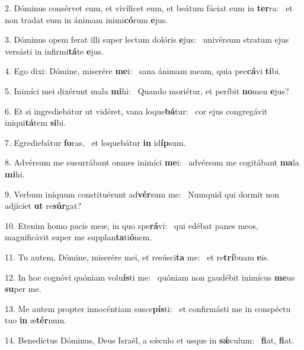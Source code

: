 2. Dóminus consérvet eum, et vivíficet eum, et beátum fáciat eum in \textbf{ter}ra: \ast\  et non tradat eum in ánimam inimi\textbf{có}rum \textbf{e}jus.\

3. Dóminus opem ferat illi super lectum dolóris \textbf{e}jus: \ast\  univérsum stratum ejus versásti in infirmi\textbf{tá}te \textbf{e}jus.\

4. Ego dixi: Dómine, miserére \textbf{me}i: \ast\  sana ánimam meam, quia pec\textbf{cá}vi \textbf{ti}bi.\

5. Inimíci mei dixérunt mala \textbf{mi}hi: \ast\  Quando moriétur, et períbit \textbf{no}men \textbf{e}jus?\

6. Et si ingrediebátur ut vidéret, vana loque\textbf{bá}tur: \ast\  cor ejus congregávit iniqui\textbf{tá}tem \textbf{si}bi.\

7. Egrediebátur \textbf{fo}ras, \ast\  et loquebátur \textbf{in} id\textbf{íp}sum.\

8. Advérsum me susurrábant omnes inimíci \textbf{me}i: \ast\  advérsum me cogitábant \textbf{ma}la \textbf{mi}hi.\

9. Verbum iníquum constituérunt ad\textbf{vér}sum me: \ast\  Numquid qui dormit non adjíciet \textbf{ut} re\textbf{súr}gat?\

10. Etenim homo pacis meæ, in quo spe\textbf{rá}vi: \ast\  qui edébat panes meos, magnificávit super me supplan\textbf{ta}ti\textbf{ó}nem.\

11. Tu autem, Dómine, miserére mei, et resúsci\textbf{ta} me: \ast\  et re\textbf{trí}buam \textbf{e}is.\

12. In hoc cognóvi quóniam volu\textbf{ís}ti me: \ast\  quóniam non gaudébit inimícus \textbf{me}us \textbf{su}per me.\

13. Me autem propter innocéntiam susce\textbf{pís}ti: \ast\  et confirmásti me in conspéctu tuo \textbf{in} æ\textbf{tér}num.\

14. Benedíctus Dóminus, Deus Israël, a sǽculo et usque in \textbf{sǽ}culum: \ast\  \textbf{fi}at, \textbf{fi}at.\

